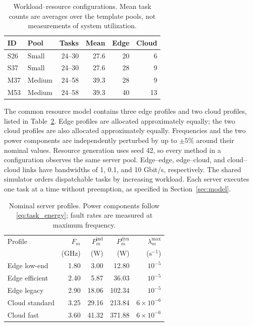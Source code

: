 \begin{table}[t]
\centering
\caption{Workload--resource configurations. Mean task counts are averages
over the template pools, not measurements of system utilization.}
\label{tab:experiment_scenarios}
\footnotesize
\setlength{\tabcolsep}{4pt}
\renewcommand{\arraystretch}{1.08}
\begin{tabular}{@{}llrrrr@{}}
\toprule
ID & Pool & Tasks & Mean & Edge & Cloud \\
\midrule
S26 & Small & 24--30 & 27.6 & 20 & 6 \\
S37 & Small & 24--30 & 27.6 & 28 & 9 \\
M37 & Medium & 24--58 & 39.3 & 28 & 9 \\
M53 & Medium & 24--58 & 39.3 & 40 & 13 \\
\bottomrule
\end{tabular}
\end{table}

The common resource model contains three edge profiles and two cloud
profiles, listed in Table~\ref{tab:experiment_resources}. Edge profiles
are allocated approximately equally; the two cloud profiles are also
allocated approximately equally. Frequencies and the two power
components are independently perturbed by up to $\pm5\%$ around their
nominal values. Resource generation uses seed 42, so every method in a
configuration observes the same server pool. Edge--edge, edge--cloud,
and cloud--cloud links have bandwidths of 1, 0.1, and 10 Gbit/s,
respectively. The shared simulator orders dispatchable tasks by
increasing workload. Each server executes one task at a time without
preemption, as specified in Section~\ref{sec:model}.

\begin{table}[t]
\centering
\caption{Nominal server profiles. Power components follow
\eqref{eq:task_energy}; fault rates are measured at maximum frequency.}
\label{tab:experiment_resources}
\footnotesize
\setlength{\tabcolsep}{3pt}
\renewcommand{\arraystretch}{1.08}
\begin{tabular}{@{}lrrrr@{}}
\toprule
Profile & $F_m$ & $P_m^{\mathrm{ind}}$ & $P_m^{\mathrm{dyn}}$ & $\lambda_m^{\max}$ \\
& (GHz) & (W) & (W) & ($\mathrm{s}^{-1}$) \\
\midrule
Edge low-end & 1.80 & 3.00 & 12.80 & $10^{-5}$ \\
Edge efficient & 2.40 & 5.87 & 36.03 & $10^{-5}$ \\
Edge legacy & 2.90 & 18.06 & 102.34 & $10^{-5}$ \\
Cloud standard & 3.25 & 29.16 & 213.84 & $6\times10^{-6}$ \\
Cloud fast & 3.60 & 41.32 & 371.88 & $6\times10^{-6}$ \\
\bottomrule
\end{tabular}
\end{table}

